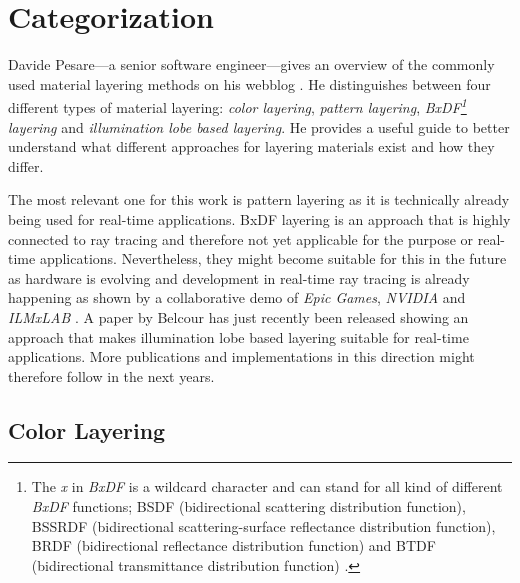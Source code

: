 \section{Categorization} 

	Davide Pesare---a senior software engineer---gives  an overview of the commonly used material layering methods on his webblog \cite{pesare2017material}. He distinguishes between four different types of material layering: \emph{color layering}, \emph{pattern layering}, \emph{BxDF\footnote{The \emph{x} in \emph{BxDF} is a wildcard character and can stand for all kind of different \emph{BxDF} functions; BSDF (bidirectional scattering distribution function), BSSRDF (bidirectional scattering-surface reflectance distribution function), BRDF (bidirectional reflectance distribution function) and BTDF (bidirectional transmittance distribution function) \cite{wiki2018BxDF}.} layering}  and \emph{illumination lobe based layering}. He provides a useful guide to better understand what different approaches for layering materials exist and how they differ. 
	
	The most relevant one for this work is pattern layering as it is technically already being used for real-time applications. BxDF layering is an approach that is highly connected to ray tracing and therefore not yet applicable for the purpose or real-time applications. Nevertheless, they might become suitable for this in the future as hardware is evolving and development in real-time ray tracing is already happening as shown by a collaborative demo of \emph{Epic Games}, \emph{NVIDIA} and \emph{ILMxLAB} \cite{epic2018RealTimeRayTracing}. A paper by Belcour \cite{laurent2018efficient} has just recently been released showing an approach that makes illumination lobe based layering suitable for real-time applications. More publications and implementations in this direction might therefore follow in the next years.   

	\subsection{Color Layering}\label{sec:ColorLayering}
	
